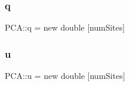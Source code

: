 \subsubsection{\texorpdfstring{q}{q}}
{\footnotesize\ttfamily P\+C\+A\+::q = new double \mbox{[}num\+Sites\mbox{]}}

\hypertarget{namespace_p_c_a_a4a22821642ff929e86e49ad05b7545ad}{}\label{namespace_p_c_a_a4a22821642ff929e86e49ad05b7545ad} 
\subsubsection{\texorpdfstring{u}{u}}
{\footnotesize\ttfamily P\+C\+A\+::u = new double \mbox{[}num\+Sites\mbox{]}}

